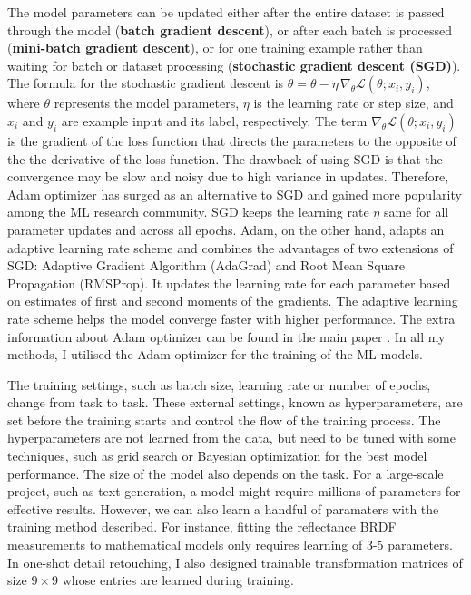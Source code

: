 The model parameters can be updated either after the entire dataset is passed through the model (\textbf{batch gradient descent}), or after each batch is processed (\textbf{mini-batch gradient descent}), or for one training example rather than waiting for batch or dataset processing (\textbf{stochastic gradient descent (SGD)}). The formula for the stochastic gradient descent is $\theta = \theta - \eta \, \nabla_{\theta} \mathcal{L}(\theta; x_i, y_i)$, where $\theta$ represents the model parameters, $\eta$ is the learning rate or step size, and $x_i$ and $y_i$ are example input and its label, respectively. The term $\nabla_{\theta} \mathcal{L}(\theta; x_i, y_i)$ is the gradient of the loss function that directs the parameters to the opposite of the the derivative of the loss function. The drawback of using SGD is that the convergence  may be slow and noisy due to high variance in updates. Therefore, Adam optimizer has surged as an alternative to SGD and gained more popularity among the ML research community. SGD keeps the learning rate $\eta$ same for all parameter updates and across all epochs. Adam, on the other hand,  adapts an adaptive learning rate scheme and combines the advantages of two extensions of SGD: Adaptive Gradient Algorithm (AdaGrad) and Root Mean Square Propagation (RMSProp). It updates the learning rate for each parameter based on estimates of first and second moments of the gradients. The adaptive learning rate scheme helps the model converge faster with higher performance. The extra information about Adam optimizer can be found in the main paper \cite{kingma2017adammethodstochasticoptimization}. In all my methods, I utilised the Adam optimizer for the training of the ML models.


The training settings, such as batch size, learning rate or number of epochs, change from task to task. These external settings, known as hyperparameters, are set before the training starts and control the flow of the training process. The hyperparameters are not learned from the data, but need to be tuned with some techniques, such as grid search or Bayesian optimization for the best model performance. The size of the model also depends on the task. For a large-scale project, such as text generation, a model might require millions of parameters for effective results. However, we can also learn a handful of paramaters with the training method described. For instance, fitting the reflectance BRDF measurements to mathematical models only requires learning of 3-5 parameters. In one-shot detail retouching, I also designed trainable transformation matrices of size $9 \times 9$ whose entries are learned during training.

